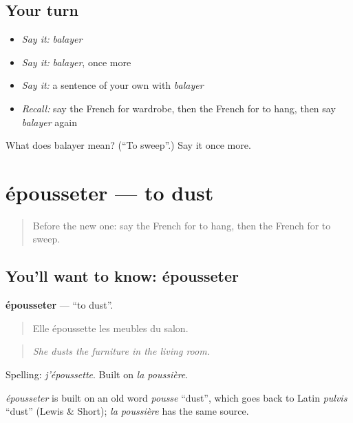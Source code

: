 \subsection*{Your turn}
\begin{itemize}
\raggedright
  \item \emph{Say it:} \emph{balayer}
  \item \emph{Say it:} \emph{balayer}, once more
  \item \emph{Say it:} a sentence of your own with \emph{balayer}
  \item \emph{Recall:} say the French for wardrobe, then the French for to hang, then say \emph{balayer} again
\end{itemize}

\begin{tcolorbox}[breakable,colback=teal!4,colframe=teal!35!black,title={Before you move on}]
What does balayer mean? (\textquotedblleft{}To sweep\textquotedblright{}.) Say it once more.
\end{tcolorbox}
\section[épousseter]{épousseter — to dust}

\label{lesson:FR-C528-epousseter}



\begin{quote}
Before the new one: say the French for to hang, then the French for to sweep.
\end{quote}

\subsection*{You'll want to know: épousseter}
\textbf{épousseter} — \textquotedblleft{}to dust\textquotedblright{}.

\begin{quote}
Elle époussette les meubles du salon.
\end{quote}

\begin{quote}
\emph{She dusts the furniture in the living room.}
\end{quote}

Spelling: \emph{j'époussette}. Built on \emph{la poussière}.

\begin{cousinweb}
\emph{épousseter} is built on an old word \emph{pousse} \textquotedblleft{}dust\textquotedblright{}, which goes back to Latin \emph{pulvis} \textquotedblleft{}dust\textquotedblright{} (Lewis \& Short); \emph{la poussière} has the same source.
\end{cousinweb}

